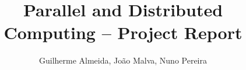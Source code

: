 \documentclass[11pt,a4paper]{report}
\begin{document}
\title{Parallel and Distributed Computing --  Project Report}
\author{Guilherme Almeida, João Malva, Nuno Pereira}






\begin{Prolog}
  \tableofcontents
  \cleardoublepage
\end{Prolog}


\StartBody

 


\nocite{*}

\end{document}
